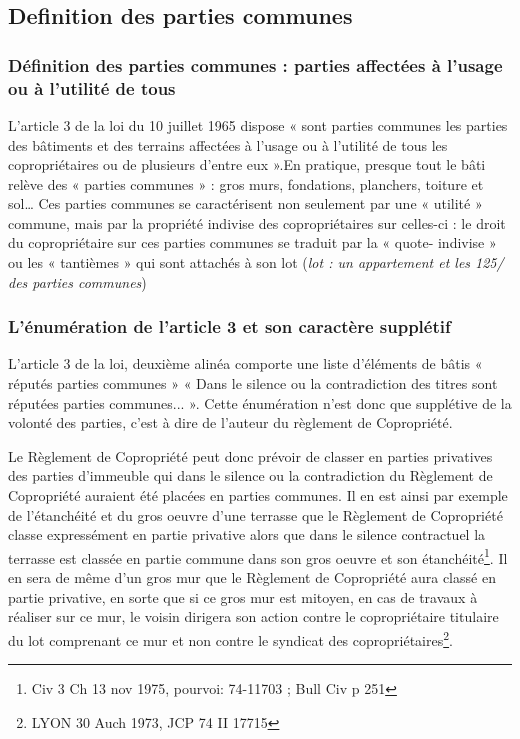 	\subsection{Definition des parties communes}
	
		\subsubsection{Définition des parties communes : parties affectées à l’usage ou à l’utilité de tous}
		
			L’article 3 de la loi du 10 juillet 1965 dispose « sont parties communes les parties des bâtiments et des
			terrains affectées à l'usage ou à l'utilité de tous les copropriétaires ou de plusieurs d'entre eux ».En
			pratique, presque tout le bâti relève des « parties communes » : gros murs, fondations, planchers, toiture
			et sol…
			Ces parties communes se caractérisent non seulement par une « utilité » commune, mais par la propriété
			indivise des copropriétaires sur celles-ci : le droit du copropriétaire sur ces parties communes se traduit
			par la « quote- indivise » ou les « tantièmes » qui sont attachés à son lot (\emph{lot  : un appartement et les	125/ \ieme des parties communes})
			
		\subsubsection{L’énumération de l’article 3 et son caractère supplétif}
		
			L'article 3 de la loi, deuxième alinéa comporte une liste d’éléments de bâtis « réputés parties communes »
			« Dans le silence ou la contradiction des titres sont réputées parties communes... ». Cette énumération
			n'est donc que supplétive de la volonté des parties, c'est à dire de l'auteur du règlement de Copropriété.
	
			Le Règlement de Copropriété peut donc prévoir de classer en parties privatives des parties d'immeuble
			qui dans le silence ou la contradiction du Règlement de Copropriété auraient été placées en parties
			communes.
			Il en est ainsi par exemple de l'étanchéité et du gros oeuvre d'une terrasse que le
			Règlement de Copropriété classe expressément en partie privative alors que dans le
			silence contractuel la terrasse est classée en partie commune dans son gros oeuvre et son
			étanchéité\footnote{Civ 3\degre{} Ch 13 nov 1975, pourvoi: 74-11703 ; Bull Civ  p 251}.
			Il en sera de même d'un gros mur que le Règlement de Copropriété aura classé en partie
			privative, en sorte que si ce gros mur est mitoyen, en cas de travaux à réaliser sur ce mur,
			le voisin dirigera son action contre le copropriétaire titulaire du lot comprenant ce mur et
			non contre le syndicat des copropriétaires\footnote{LYON 30 Auch 1973, JCP 74 II 17715}.
		
